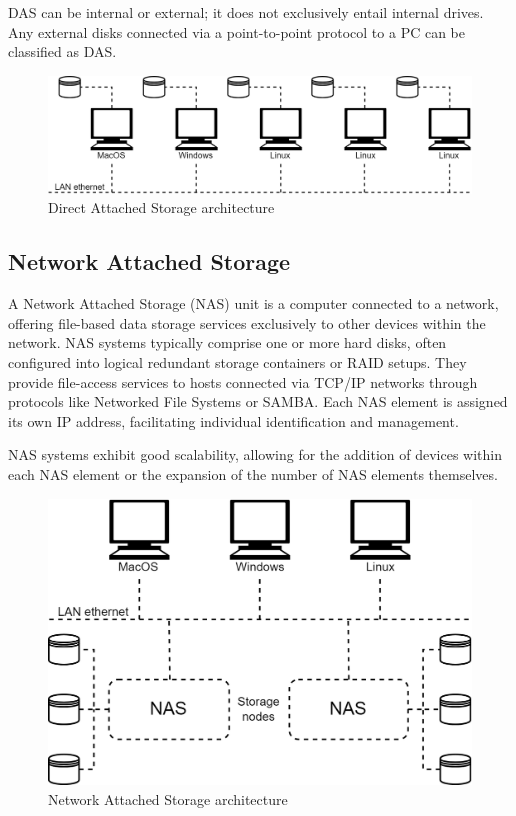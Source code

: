 DAS can be internal or external; it does not exclusively entail internal drives. 
Any external disks connected via a point-to-point protocol to a PC can be classified as DAS.
\begin{figure}[H]
    \centering
    \includegraphics[width=0.75\linewidth]{images/das.png}
    \caption{Direct Attached Storage architecture}
\end{figure}


\subsection{Network Attached Storage}
A Network Attached Storage (NAS) unit is a computer connected to a network, offering file-based data storage services exclusively to other devices within the network. 
NAS systems typically comprise one or more hard disks, often configured into logical redundant storage containers or RAID setups. 
They provide file-access services to hosts connected via TCP/IP networks through protocols like Networked File Systems or SAMBA. 
Each NAS element is assigned its own IP address, facilitating individual identification and management.

NAS systems exhibit good scalability, allowing for the addition of devices within each NAS element or the expansion of the number of NAS elements themselves.
\begin{figure}[H]
    \centering
    \includegraphics[width=0.6\linewidth]{images/nas.png}
    \caption{Network Attached Storage architecture}
\end{figure}


